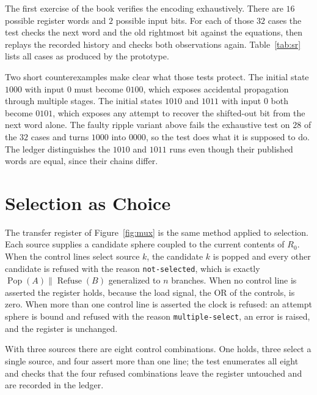 \documentclass[11pt,oneside]{report}
\newcommand{\Pop}{\operatorname{Pop}}
\newcommand{\Refuse}{\operatorname{Refuse}}
\theoremstyle{plain}
\theoremstyle{definition}
\theoremstyle{remark}
\newcommand{\code}[2][Python]{}
\begin{document}
The first exercise of the book verifies the encoding exhaustively. There are $16$ possible register words and $2$ possible input bits. For each of those $32$ cases the test checks the next word and the old rightmost bit against the equations, then replays the recorded history and checks both observations again. Table~\ref{tab:sr} lists all cases as produced by the prototype.

\begin{table}[H]
\centering

\caption{All thirty-two transitions of the four-bit shift register, generated by the prototype. The column Out is the old $q_3$.}
\label{tab:sr}
\end{table}

Two short counterexamples make clear what those tests protect. The initial state $1000$ with input $0$ must become $0100$, which exposes accidental propagation through multiple stages. The initial states $1010$ and $1011$ with input $0$ both become $0101$, which exposes any attempt to recover the shifted-out bit from the next word alone. The faulty ripple variant above fails the exhaustive test on $28$ of the $32$ cases and turns $1000$ into $0000$, so the test does what it is supposed to do. The ledger distinguishes the $1010$ and $1011$ runs even though their published words are equal, since their chains differ.

\section{Selection as Choice}

The transfer register of Figure~\ref{fig:mux} is the same method applied to selection. Each source supplies a candidate sphere coupled to the current contents of $R_0$. When the control lines select source $k$, the candidate $k$ is popped and every other candidate is refused with the reason \texttt{not-selected}, which is exactly $\Pop(A)\parallel\Refuse(B)$ generalized to $n$ branches. When no control line is asserted the register holds, because the load signal, the OR of the controls, is zero. When more than one control line is asserted the clock is refused: an attempt sphere is bound and refused with the reason \texttt{multiple-select}, an error is raised, and the register is unchanged.

\code{ex_regs_transfer}

With three sources there are eight control combinations. One holds, three select a single source, and four assert more than one line; the test enumerates all eight and checks that the four refused combinations leave the register untouched and are recorded in the ledger.
\end{document}
